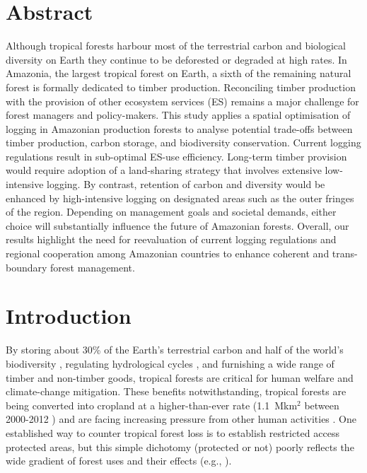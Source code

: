 \documentclass{article}
\begin{document}
\section{Abstract}

Although tropical forests harbour most of the terrestrial carbon and biological diversity on Earth they continue to be deforested or degraded at high rates. In Amazonia, the largest tropical forest on Earth, a sixth of the remaining natural forest is formally dedicated to timber production. Reconciling  timber production with the provision of other ecosystem services (ES) remains a major challenge for forest managers and policy-makers. This study applies a spatial optimisation of logging in Amazonian production forests to analyse potential trade-offs between timber production, carbon storage, and biodiversity conservation. Current logging regulations result in sub-optimal ES-use efficiency. Long-term timber provision would require adoption of a land-sharing strategy that involves extensive low-intensive logging. By contrast, retention of carbon and diversity would be enhanced by high-intensive logging on designated areas such as the outer fringes of the region. Depending on management goals and societal demands, either choice will substantially influence the future of Amazonian forests. Overall, our results highlight the need for reevaluation of current logging regulations and regional cooperation among Amazonian countries to enhance coherent and trans-boundary forest management.

\twocolumn

\section{Introduction}

By storing about 30\% of the Earth’s terrestrial carbon \cite{Pan2013} and half of the world’s biodiversity \cite{Pimm2014}, regulating hydrological cycles \cite{Fisher2009a}, and furnishing a wide range of timber and non-timber goods, tropical forests are critical for human welfare and climate-change mitigation. These benefits notwithstanding, tropical forests are being converted into cropland at a higher-than-ever rate (1.1~Mkm$^2$ between 2000-2012 \cite{Hansen2013}) and are facing increasing pressure from other human activities \cite{Lewis2015}. One established way to counter tropical forest loss is to establish restricted access protected areas, but this simple dichotomy (protected or not) poorly reflects the wide gradient of forest uses and their effects (e.g., \cite{DeCastroSolar2015,Gibson2011}). 
\end{document}
